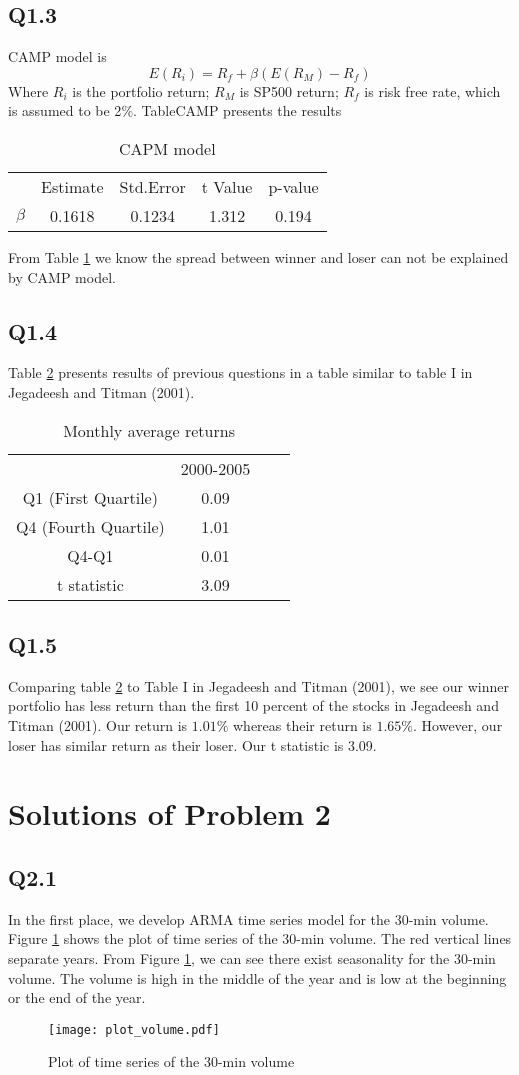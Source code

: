 \documentclass[11pt]{article}
\begin{document}
\subsection{Q1.3}
CAMP model is
\[
E(R_i)=R_f+\beta(E(R_M)-R_f)
\]
Where $R_i$ is the portfolio return; $R_M$ is SP500 return; $R_f$ is risk free rate, which is assumed to be 2$\%$.
Table{CAMP} presents the results
\begin{table}[htbp]
\centering
\begin{tabular}{ccccc}
\hline
&Estimate&Std.Error&t Value & p-value\\
$\beta$&0.1618&0.1234&1.312&0.194\\
\hline
\end{tabular}
\caption{CAPM model}\label{CAMP}
\end{table}
From Table \ref{CAMP} we know the spread between winner and loser can not be explained by CAMP model.
\subsection{Q1.4}
Table \ref{tableq1.4} presents results of previous questions in a table similar to table I in Jegadeesh and Titman (2001). 
\begin{table}[htbp]
\centering
\begin{tabular}{cccc}
\hline
&2000-2005\\
Q1 (First Quartile)&0.09\\
Q4 (Fourth Quartile)&1.01\\
Q4-Q1&0.01\\
t statistic&3.09\\
\hline
\end{tabular}
\caption{Monthly average returns}\label{tableq1.4}
\end{table}
\subsection{Q1.5}
Comparing table \ref{tableq1.4} to Table I in Jegadeesh and Titman (2001), we see our winner portfolio has less return than the first 10 percent of the stocks in Jegadeesh and Titman (2001). Our return is $1.01\%$ whereas their return is $1.65\%$. However, our loser has similar return as their loser. Our t statistic is 3.09. 

 \section{Solutions of Problem 2}
\subsection{Q2.1}
In the first place, we develop ARMA time series model for the 30-min volume. Figure \ref{plot_volume} shows the plot of time series of the 30-min volume. The red vertical lines separate years. From Figure \ref{plot_volume}, we can see there exist seasonality for the 30-min volume. The volume is high in the middle of the year and is low at the beginning or the end of the year. 
\begin{figure}
\texttt{[image: plot\_volume.pdf]}
\caption{Plot of time series of the 30-min volume}\label{plot_volume}
\end{figure}
\end{document}
